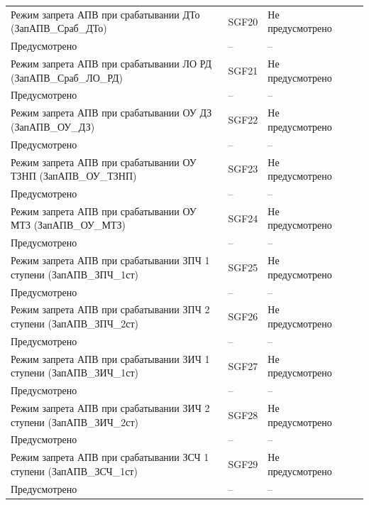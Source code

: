 \begin{longtable}{|>{\centering\arraybackslash}m{5.3cm}|>{\centering\arraybackslash}m{3.3cm}|>{\centering\arraybackslash}m{4.2cm}|>{\centering\arraybackslash}m{1.8cm}|>{\centering\arraybackslash}m{1cm}|}
\hline
\centering Режим запрета АПВ при срабатывании ДТо (ЗапАПВ\_Сраб\_ДТо)  & \centering SGF20 & \centering Не предусмотрено \\ Предусмотрено & \centering -- & \centering \arraybackslash -- \\
\hline
\centering Режим запрета АПВ при срабатывании ЛО РД (ЗапАПВ\_Сраб\_ЛО\_РД)  & \centering SGF21 & \centering Не предусмотрено \\ Предусмотрено & \centering -- & \centering \arraybackslash -- \\
\hline
\centering Режим запрета АПВ при срабатывании ОУ ДЗ (ЗапАПВ\_ОУ\_ДЗ)  & \centering SGF22 & \centering Не предусмотрено \\ Предусмотрено & \centering -- & \centering \arraybackslash -- \\
\hline
\centering Режим запрета АПВ при срабатывании ОУ ТЗНП (ЗапАПВ\_ОУ\_ТЗНП)  & \centering SGF23 & \centering Не предусмотрено \\ Предусмотрено & \centering -- & \centering \arraybackslash -- \\
\hline
\centering Режим запрета АПВ при срабатывании ОУ МТЗ (ЗапАПВ\_ОУ\_МТЗ)  & \centering SGF24 & \centering Не предусмотрено \\ Предусмотрено & \centering -- & \centering \arraybackslash -- \\
\hline
\centering Режим запрета АПВ при срабатывании ЗПЧ 1 ступени (ЗапАПВ\_ЗПЧ\_1ст)  & \centering SGF25 & \centering Не предусмотрено \\ Предусмотрено & \centering -- & \centering \arraybackslash -- \\
\hline
\centering Режим запрета АПВ при срабатывании ЗПЧ 2 ступени (ЗапАПВ\_ЗПЧ\_2ст)  & \centering SGF26 & \centering Не предусмотрено \\ Предусмотрено & \centering -- & \centering \arraybackslash -- \\
\hline
\centering Режим запрета АПВ при срабатывании ЗИЧ 1 ступени (ЗапАПВ\_ЗИЧ\_1ст)  & \centering SGF27 & \centering Не предусмотрено \\ Предусмотрено & \centering -- & \centering \arraybackslash -- \\
\hline
\centering Режим запрета АПВ при срабатывании ЗИЧ 2 ступени (ЗапАПВ\_ЗИЧ\_2ст)  & \centering SGF28 & \centering Не предусмотрено \\ Предусмотрено & \centering -- & \centering \arraybackslash -- \\
\hline
\centering Режим запрета АПВ при срабатывании ЗСЧ 1 ступени (ЗапАПВ\_ЗСЧ\_1ст)  & \centering SGF29 & \centering Не предусмотрено \\ Предусмотрено & \centering -- & \centering \arraybackslash -- \\

\end{longtable}
